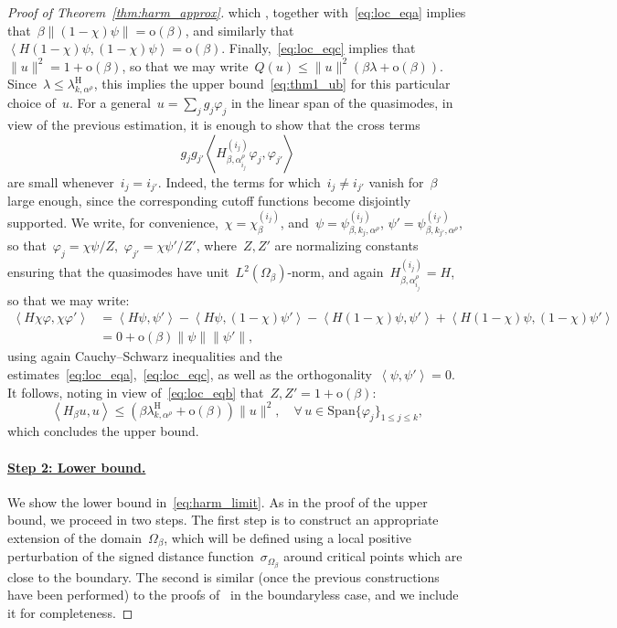 \documentclass[10pt]{article}
\newcommand{\1}{\mathbbm 1}
\newcommand{\shift}{\rho} %
\begin{document}
\begin{proof}[Proof of Theorem~\ref{thm:harm_approx}]
        which , together with~\eqref{eq:loc_eqa} implies that~$\beta\|(1-\chi)\psi\|=\mathrm{o}(\beta)$, and similarly that~$\left\langle H(1-\chi)\psi,(1-\chi)\psi\right\rangle = \mathrm{o}(\beta)$.
        Finally,~\eqref{eq:loc_eqc} implies that~$\|u\|^2 = 1 + \mathrm{o}(\beta)$, so that we may write~$Q(u)\leq \|u\|^2(\beta\lambda + \mathrm{o}(\beta))$.
        Since~$\lambda\leq \lambda_{k,\alpha^\shift}^{\mathrm H}$, this implies the upper bound~\eqref{eq:thm1_ub} for this particular choice of~$u$.
        For a general~$u = \sum_j g_j \varphi_j$ in the linear span of the quasimodes, in view of the previous estimation, it is enough to show that the cross terms
        \[g_jg_{j'}\left\langle H_{\beta,\alpha_{i_j}^\shift}^{(i_j)}\varphi_j,\varphi_{j'}\right\rangle\]
        are small whenever~$i_j = i_{j'}$. Indeed, the terms for which~$i_j \neq i_{j'}$ vanish for~$\beta$ large enough, since the corresponding cutoff functions become disjointly supported.
        We write, for convenience,~$\chi = \chi_\beta^{(i_j)}$, and~$\psi = \psi^{(i_j)}_{\beta,k_j,\alpha^\shift}$, $\psi' = \psi^{(i_{j'})}_{\beta,k_{j'},\alpha^\shift}$, so that~$\varphi_j = \chi \psi/Z$,~$\varphi_{j'} = \chi\psi'/Z'$, where~$Z,Z'$ are normalizing constants ensuring that the quasimodes have unit~$L^2(\Omega_\beta)$-norm, and again~$H_{\beta,\alpha_{i_j}^\shift}^{(i_j)}=H$, so that we may write:
        \[\begin{aligned}
            \left\langle H\chi\varphi,\chi\varphi'\right\rangle &= \left\langle H\psi,\psi'\right\rangle - \left\langle H\psi,(1-\chi)\psi'\right\rangle - \left\langle H(1-\chi)\psi,\psi'\right\rangle + \left\langle H(1-\chi)\psi,(1-\chi)\psi'\right\rangle\\
            &= 0 + \mathrm{o}(\beta)\|\psi\|\|\psi'\|,
        \end{aligned}
        \]
        using again Cauchy--Schwarz inequalities and the estimates~\eqref{eq:loc_eqa},~\eqref{eq:loc_eqc}, as well as the orthogonality~$\left\langle \psi,\psi'\right\rangle = 0$.
        It follows, noting in view of~\eqref{eq:loc_eqb} that~$Z,Z' = 1 +\mathrm{o}(\beta)$:
        \[\left\langle H_\beta u,u\right\rangle \leq (\beta\lambda_{k,\alpha^\shift}^{\mathrm H}+\mathrm{o}(\beta))\|u\|^2,\quad \forall\,u\in\mathrm{Span}\{\varphi_j\}_{1\leq j\leq k},\]
        which concludes the upper bound.

        \paragraph{\underline{Step 2: Lower bound.}}
        We show the lower bound in~\eqref{eq:harm_limit}. As in the proof of the upper bound, we proceed in two steps.
        The first step is to construct an appropriate extension of the domain~$\Omega_\beta$, which will be defined using a local positive perturbation of the signed distance function~$\sigma_{\Omega_\beta}$ around critical points which are close to the boundary.
        The second is similar (once the previous constructions have been performed) to the proofs of~\cite{S83,CFKS87} in the boundaryless case, and we include it for completeness.


\end{proof}
\end{document}
